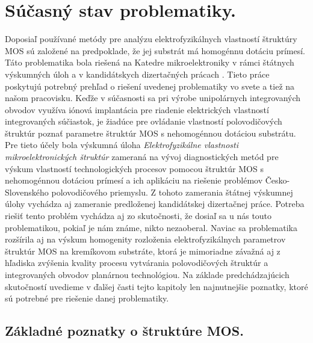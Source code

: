 
\chapter{Súčasný stav problematiky.} %

\label{Chapter1} %


Doposiaľ používané metódy pre analýzu elektrofyzikálnych vlastností
štruktúry MOS sú založené na predpoklade, že jej substrát má homogénnu
dotáciu prímesí. Táto problematika bola riešená na Katedre
mikroelektroniky v rámci štátnych výskumných úloh \cite{1.1,1.2} a v
kandidátskych dizertačných prácach \cite{1.5,1.6,1.7,1.8}. Tieto práce
poskytujú potrebný prehľad o riešení uvedenej problematiky vo svete a
tiež na našom pracovisku. Keďže v súčasnosti sa pri výrobe
unipolárnych integrovaných obvodov využíva iónová implantácia pre
riadenie elektrických vlastností integrovaných súčiastok, je žiadúce
pre ovládanie vlastností polovodičových štruktúr poznať parametre
štruktúr MOS s nehomogénnou dotáciou substrátu. Pre tieto účely bola
výskumná úloha {\em Elektrofyzikálne vlastnosti mikroelektronických
štruktúr} \cite{1.3,1.4} zameraná na vývoj diagnostických metód pre
výskum vlastností technologických procesov pomocou štruktúr MOS s
nehomogénnou dotáciou prímesí a ich aplikáciu na riešenie problémov
Česko-Slovenského polovodičového priemyslu. Z tohoto zamerania štátnej
výskumnej úlohy vychádza aj zameranie predloženej kandidátskej
dizertačnej práce. Potreba riešiť tento problém vychádza aj zo
skutočnosti, že dosiaľ sa u nás touto problematikou, pokiaľ je nám
známe, nikto nezaoberal. Naviac sa problematika rozšírila aj na výskum
homogenity rozloženia elektrofyzikálnych parametrov štruktúr MOS na
kremíkovom substráte, ktorá je mimoriadne závažná aj z hľadiska
zvýšenia kvality procesu vytvárania polovodičových štruktúr a
integrovaných obvodov planárnou technológiou. Na základe
predchádzajúcich skutočností uvedieme v ďalšej časti tejto kapitoly
len najnutnejšie poznatky, ktoré sú potrebné pre riešenie danej
problematiky.

\section{Základné poznatky o štruktúre MOS.}


